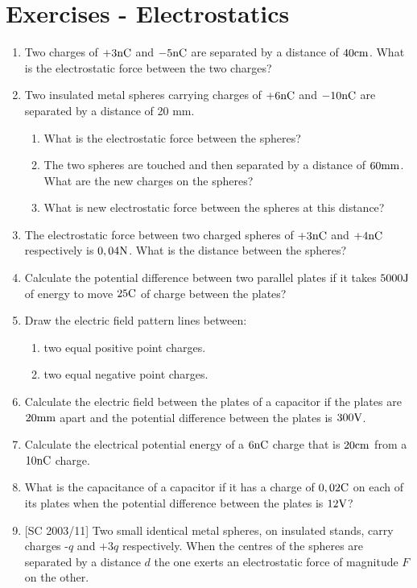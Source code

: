 \section{Exercises - Electrostatics}
\begin{enumerate}

\item Two charges of $+3{\rm nC}$ and $-5{\rm nC}$ are separated by a distance of $40 {\rm cm}$. What is the electrostatic force between the two charges?
\item {Two insulated metal spheres carrying charges of  $+6{\rm nC}$ and $-10{\rm nC}$ are separated by a distance of 20 mm.
\begin {enumerate}
\item {What is the electrostatic force between the spheres?}
\item {The two spheres are touched and then separated by a distance of $60 {\rm mm}$. What are the new charges on the spheres?}
\item {What is new electrostatic force between the spheres at this distance?}
\end {enumerate}}
\item The electrostatic force between two charged spheres of $+3{\rm nC}$ and $+4{\rm nC}$ respectively is $0,04 {\rm N}$. What is the distance between the spheres?
\item Calculate the potential difference between two parallel plates if it takes $5000 {\rm J}$ of energy to move $25 {\rm C}$ of charge between the plates?
\item {Draw the electric field pattern lines between:
\begin {enumerate}
\item {two equal positive point charges.}
\item {two equal negative point charges.}
\end {enumerate}}
\item Calculate the electric field between the plates of a capacitor if the plates are $20 {\rm mm}$ apart and the potential difference between the plates is $300 {\rm V}$.
\item Calculate the electrical potential energy of a $6 {\rm nC}$ charge that is $20 {\rm cm}$ from a $10 {\rm nC}$ charge.
\item What is the capacitance of a capacitor if it has a charge of $0,02 {\rm C}$ on each of its plates when the potential difference between the plates is $12 {\rm V}$?
\item{[SC 2003/11] Two small identical metal spheres, on insulated stands, carry charges -$q$ and $+3q$ respectively. When the centres of the spheres are separated by a distance $d$ the one exerts an electrostatic force of magnitude $F$ on the other.

}
\end{enumerate}
